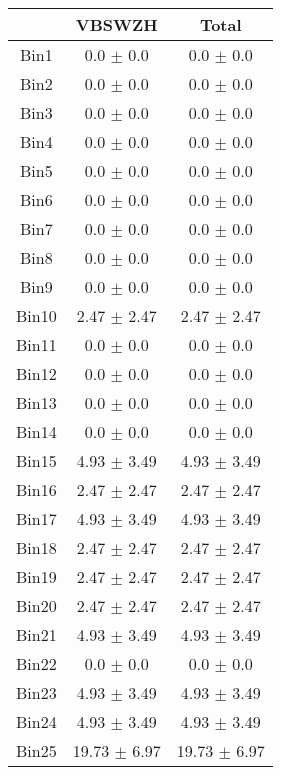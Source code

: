   \begin{tabular}{|c|c|c|}
  \hline
      & VBSWZH & Total \\ \cline{1-3} 
     \hline\hline
     Bin1 & 0.0 $\pm$ 0.0 & 0.0 $\pm$ 0.0 \\ \cline{1-3} 
     Bin2 & 0.0 $\pm$ 0.0 & 0.0 $\pm$ 0.0 \\ \cline{1-3} 
     Bin3 & 0.0 $\pm$ 0.0 & 0.0 $\pm$ 0.0 \\ \cline{1-3} 
     Bin4 & 0.0 $\pm$ 0.0 & 0.0 $\pm$ 0.0 \\ \cline{1-3} 
     Bin5 & 0.0 $\pm$ 0.0 & 0.0 $\pm$ 0.0 \\ \cline{1-3} 
     Bin6 & 0.0 $\pm$ 0.0 & 0.0 $\pm$ 0.0 \\ \cline{1-3} 
     Bin7 & 0.0 $\pm$ 0.0 & 0.0 $\pm$ 0.0 \\ \cline{1-3} 
     Bin8 & 0.0 $\pm$ 0.0 & 0.0 $\pm$ 0.0 \\ \cline{1-3} 
     Bin9 & 0.0 $\pm$ 0.0 & 0.0 $\pm$ 0.0 \\ \cline{1-3} 
     Bin10 & 2.47 $\pm$ 2.47 & 2.47 $\pm$ 2.47 \\ \cline{1-3} 
     Bin11 & 0.0 $\pm$ 0.0 & 0.0 $\pm$ 0.0 \\ \cline{1-3} 
     Bin12 & 0.0 $\pm$ 0.0 & 0.0 $\pm$ 0.0 \\ \cline{1-3} 
     Bin13 & 0.0 $\pm$ 0.0 & 0.0 $\pm$ 0.0 \\ \cline{1-3} 
     Bin14 & 0.0 $\pm$ 0.0 & 0.0 $\pm$ 0.0 \\ \cline{1-3} 
     Bin15 & 4.93 $\pm$ 3.49 & 4.93 $\pm$ 3.49 \\ \cline{1-3} 
     Bin16 & 2.47 $\pm$ 2.47 & 2.47 $\pm$ 2.47 \\ \cline{1-3} 
     Bin17 & 4.93 $\pm$ 3.49 & 4.93 $\pm$ 3.49 \\ \cline{1-3} 
     Bin18 & 2.47 $\pm$ 2.47 & 2.47 $\pm$ 2.47 \\ \cline{1-3} 
     Bin19 & 2.47 $\pm$ 2.47 & 2.47 $\pm$ 2.47 \\ \cline{1-3} 
     Bin20 & 2.47 $\pm$ 2.47 & 2.47 $\pm$ 2.47 \\ \cline{1-3} 
     Bin21 & 4.93 $\pm$ 3.49 & 4.93 $\pm$ 3.49 \\ \cline{1-3} 
     Bin22 & 0.0 $\pm$ 0.0 & 0.0 $\pm$ 0.0 \\ \cline{1-3} 
     Bin23 & 4.93 $\pm$ 3.49 & 4.93 $\pm$ 3.49 \\ \cline{1-3} 
     Bin24 & 4.93 $\pm$ 3.49 & 4.93 $\pm$ 3.49 \\ \cline{1-3} 
     Bin25 & 19.73 $\pm$ 6.97 & 19.73 $\pm$ 6.97 \\ \cline{1-3} 

\end{tabular}
